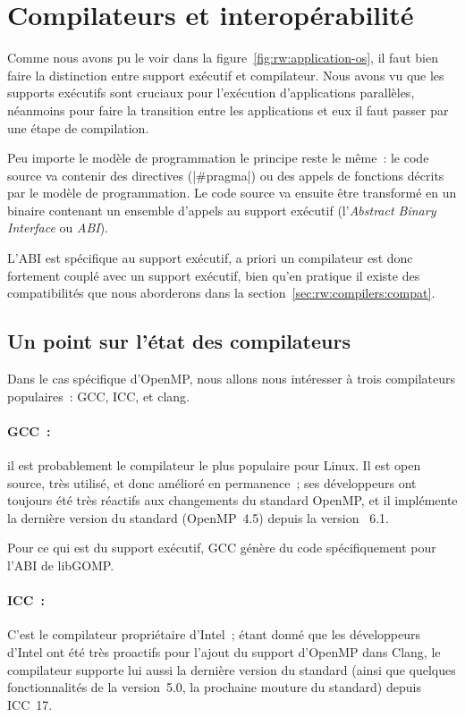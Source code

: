 \section{Compilateurs et interopérabilité}\label{sec:rw:compilers}

Comme nous avons pu le voir dans la figure~\ref{fig:rw:application-os}, il faut bien faire la distinction entre support exécutif et compilateur.
Nous avons vu que les supports exécutifs sont cruciaux pour l'exécution d'applications parallèles, néanmoins pour faire la transition entre les applications et eux il faut passer par une étape de compilation.

Peu importe le modèle de programmation le principe reste le même~: le code source va contenir des directives (|#pragma|) ou des appels de fonctions décrits par le modèle de programmation. Le code source va ensuite être transformé en un binaire contenant un ensemble d'appels au support exécutif (l'\emph{Abstract Binary Interface} ou \emph{ABI}).

L'ABI est spécifique au support exécutif, a priori un compilateur est donc fortement couplé avec un support exécutif, bien qu'en pratique il existe des compatibilités que nous aborderons dans la section~\ref{sec:rw:compilers:compat}.



\subsection{Un point sur l'état des compilateurs}\label{sec:rw:compilers:desc}

Dans le cas spécifique d'OpenMP, nous allons nous intéresser à trois compilateurs populaires~: GCC, ICC, et clang.

\paragraph{GCC~:}
il est probablement le compilateur le plus populaire pour Linux.
Il est open source, très utilisé, et donc amélioré en permanence~; ses développeurs ont toujours été très réactifs aux changements du standard OpenMP, et il implémente la dernière version du standard (OpenMP~4.5) depuis la version ~6.1.

Pour ce qui est du support exécutif, GCC génère du code spécifiquement pour l'ABI de libGOMP.



\paragraph{ICC~:}
C'est le compilateur propriétaire d'Intel~; étant donné que les développeurs d'Intel ont été très proactifs pour l'ajout du support d'OpenMP dans Clang, le compilateur supporte lui aussi la dernière version du standard (ainsi que quelques fonctionnalités de la version~5.0, la prochaine mouture du standard) depuis ICC~17.

